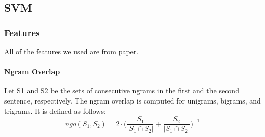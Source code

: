 \documentclass[10pt, a4paper]{article}
\begin{document}
%
%
%

\newpage
\subsection{SVM}

\subsubsection{Features}
All of the features we used are from \citep{Saric2012TakeLabSF} paper.
\paragraph{Ngram Overlap \\}
Let S1 and S2 be the sets of consecutive ngrams in the first and the second sentence, respectively. The ngram overlap is computed for unigrams, bigrams, and trigrams. It is defined as follows:
\begin{equation}\label{eq:ngo}
ngo(S_1, S_2) = 2 \cdot \bigg( \frac{|S_1|}{|S_1 \cap S_2|}+\frac{|S_2|}{|S_1 \cap S_2|}\bigg)^{-1}
\end{equation}
\end{document}
